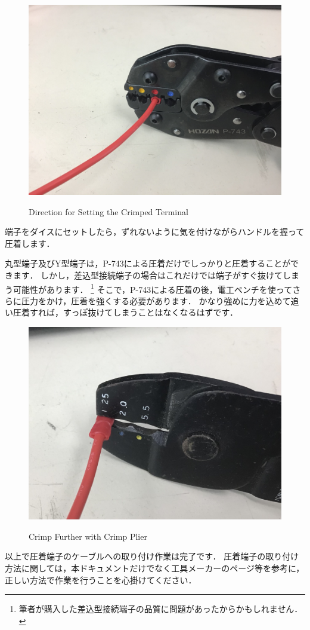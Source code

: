 \documentclass[{../../master}]{subfiles}
\begin{document}
\begin{figure}[ht]
  \centering
  \includegraphics[height=50truemm]{images/direction_for_setting_the_crimped_terminal.jpg}
  \label{fig:direction_for_setting_the_crimped_terminal}
  \caption{Direction for Setting the Crimped Terminal}
\end{figure}

端子をダイスにセットしたら，ずれないように気を付けながらハンドルを握って圧着します．

丸型端子及びY型端子は，P-743による圧着だけでしっかりと圧着することができます．
しかし，差込型接続端子の場合はこれだけでは端子がすぐ抜けてしまう可能性があります．
\footnote{筆者が購入した差込型接続端子の品質に問題があったからかもしれません．}
そこで，P-743による圧着の後，電工ペンチを使ってさらに圧力をかけ，圧着を強くする必要があります．
かなり強めに力を込めて追い圧着すれば，すっぽ抜けてしまうことはなくなるはずです．

\begin{figure}[ht]
  \centering
  \includegraphics[height=50truemm]{images/crimp_further_with_crimp_plier.jpg}
  \label{fig:crimp_further_with_crimp_plier}
  \caption{Crimp Further with Crimp Plier}
\end{figure}

以上で圧着端子のケーブルへの取り付け作業は完了です．
圧着端子の取り付け方法に関しては，本ドキュメントだけでなく工具メーカーのページ等を参考に，正しい方法で作業を行うことを心掛けてください．
\end{document}
